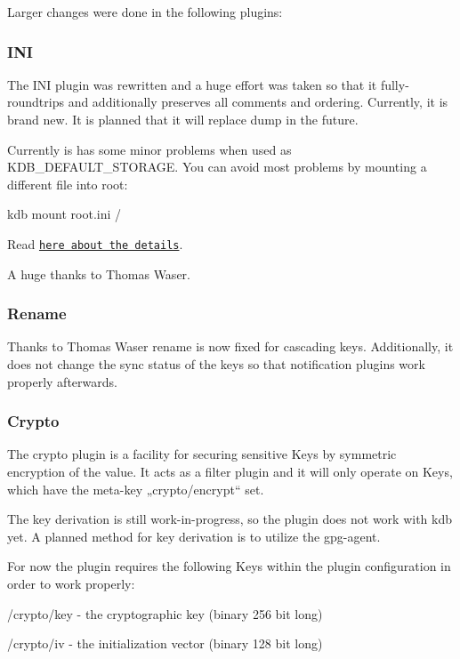 Larger changes were done in the following plugins\+:

\subsubsection*{I\+N\+I}

The I\+N\+I plugin was rewritten and a huge effort was taken so that it fully-\/roundtrips and additionally preserves all comments and ordering. Currently, it is brand new. It is planned that it will replace {\ttfamily dump} in the future.

Currently is has some minor problems when used as K\+D\+B\+\_\+\+D\+E\+F\+A\+U\+L\+T\+\_\+\+S\+T\+O\+R\+A\+G\+E. You can avoid most problems by mounting a different file into root\+: \begin{DoxyVerb}    kdb mount root.ini /
\end{DoxyVerb}


Read \href{https://github.com/ElektraInitiative/libelektra/tree/master/src/plugins/ini}{\tt here about the details}.

A huge thanks to Thomas Waser.

\subsubsection*{Rename}

Thanks to Thomas Waser {\ttfamily rename} is now fixed for cascading keys. Additionally, it does not change the {\ttfamily sync} status of the keys so that notification plugins work properly afterwards.

\subsubsection*{Crypto}

The crypto plugin is a facility for securing sensitive Keys by symmetric encryption of the value. It acts as a filter plugin and it will only operate on Keys, which have the meta-\/key „crypto/encrypt“ set.

The key derivation is still work-\/in-\/progress, so the plugin does not work with kdb yet. A planned method for key derivation is to utilize the gpg-\/agent.

For now the plugin requires the following Keys within the plugin configuration in order to work properly\+:


\begin{DoxyEnumerate}
\item /crypto/key -\/ the cryptographic key (binary 256 bit long)
\item /crypto/iv -\/ the initialization vector (binary 128 bit long)
\end{DoxyEnumerate}

